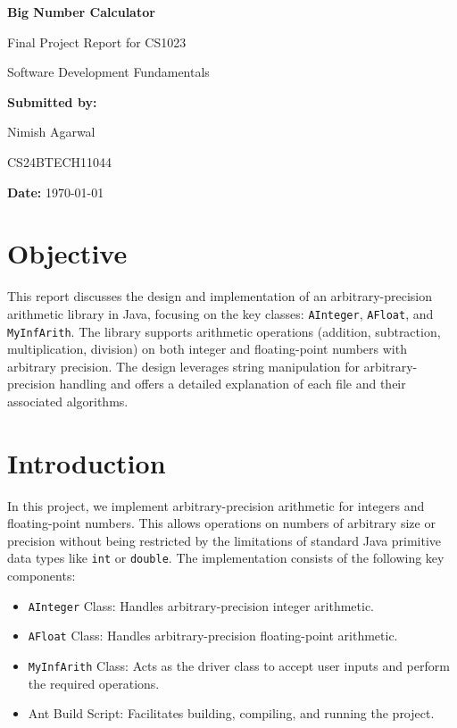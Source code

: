 \documentclass[12pt]{article}
\begin{document}
\begin{titlepage}
    \centering
    \vspace*{3cm}
    
    {\Huge \textbf{Big Number Calculator} \par}
    \vspace{1cm}
    
    {\Large Final Project Report for CS1023 \par}
    {\Large Software Development Fundamentals \par}
    
    \vspace{2.5cm}
    
    {\large \textbf{Submitted by:} \par}
    \vspace{0.3cm}
    {\large Nimish Agarwal \par}
    {\large CS24BTECH11044 \par}
    
    \vspace{2cm}
    
    {\large \textbf{Date:} \today \par}
    
    \vfill
\end{titlepage}
\section{Objective}
This report discusses the design and implementation of an arbitrary-precision arithmetic library in Java, focusing on the key classes: \texttt{AInteger}, \texttt{AFloat}, and \texttt{MyInfArith}. The library supports arithmetic operations (addition, subtraction, multiplication, division) on both integer and floating-point numbers with arbitrary precision. The design leverages string manipulation for arbitrary-precision handling and offers a detailed explanation of each file and their associated algorithms.

\section{Introduction}
In this project, we implement arbitrary-precision arithmetic for integers and floating-point numbers. This allows operations on numbers of arbitrary size or precision without being restricted by the limitations of standard Java primitive data types like \texttt{int} or \texttt{double}. The implementation consists of the following key components:
\begin{itemize}
    \item \texttt{AInteger} Class: Handles arbitrary-precision integer arithmetic.
    \item \texttt{AFloat} Class: Handles arbitrary-precision floating-point arithmetic.
    \item \texttt{MyInfArith} Class: Acts as the driver class to accept user inputs and perform the required operations.
    \item Ant Build Script: Facilitates building, compiling, and running the project.
\end{itemize}
\end{document}
